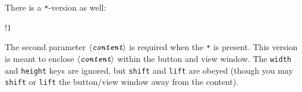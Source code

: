\documentclass{article}
\def\meta#1{$\langle\textit{\texttt{#1}}\rangle$}
\begin{document}
\newtopic\noindent
There is a \texttt{*}-version as well:
\bVerb %
{}%
\setlength{\dimen0}{\bxSize}%
\def\1{\rlap{\hspace*{\dimen0}\sffamily(Click on box to zoom in)}}
\jdRect[width=\bxSize,height=1.5\baselineskip,lift=\baselineskip,adddestw=10bp,adddesth=10bp]\relax
\begin{dCmd}[commandchars=!()]{\bxSize}
!1
\end{dCmd}
\eVerb
The second parameter \meta{content} is required when the \texttt{*} is
present. This version is meant to enclose \meta{content} within the button
and view window. The \texttt{width} and \texttt{height} keys are ignored,
but \texttt{shift} and \texttt{lift} are obeyed (though you may
\texttt{shift} or \texttt{lift} the button/view window away from the
content).
\end{document}
